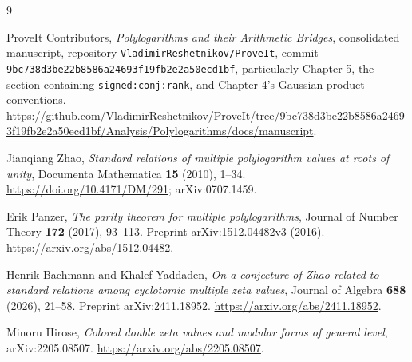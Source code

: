 \documentclass[11pt,a4paper]{article}
\numberwithin{equation}{section}
\theoremstyle{definition}\newtheorem{definition}[theorem]{Definition}
\theoremstyle{remark}\newtheorem{remark}[theorem]{Remark}
\newcommand{\pathtext}[1]{\nolinkurl{#1}}
\begin{document}
\begin{thebibliography}{9}
\raggedright
{}
ProveIt Contributors,
\emph{Polylogarithms and their Arithmetic Bridges}, consolidated manuscript,
repository \texttt{VladimirReshetnikov/ProveIt}, commit
\pathtext{9bc738d3be22b8586a24693f19fb2e2a50ecd1bf},
particularly Chapter 5, the section containing
\pathtext{signed:conj:rank}, and Chapter 4's Gaussian product conventions.
\url{https://github.com/VladimirReshetnikov/ProveIt/tree/9bc738d3be22b8586a24693f19fb2e2a50ecd1bf/Analysis/Polylogarithms/docs/manuscript}.

Jianqiang Zhao,
\emph{Standard relations of multiple polylogarithm values at roots of unity},
Documenta Mathematica \textbf{15} (2010), 1--34.
\url{https://doi.org/10.4171/DM/291}; arXiv:0707.1459.

Erik Panzer,
\emph{The parity theorem for multiple polylogarithms},
Journal of Number Theory \textbf{172} (2017), 93--113.
Preprint arXiv:1512.04482v3 (2016).
\url{https://arxiv.org/abs/1512.04482}.

Henrik Bachmann and Khalef Yaddaden,
\emph{On a conjecture of Zhao related to standard relations among cyclotomic
multiple zeta values}, Journal of Algebra \textbf{688} (2026), 21--58.
Preprint arXiv:2411.18952.
\url{https://arxiv.org/abs/2411.18952}.

Minoru Hirose,
\emph{Colored double zeta values and modular forms of general level},
arXiv:2205.08507.
\url{https://arxiv.org/abs/2205.08507}.
\end{thebibliography}
\end{document}
